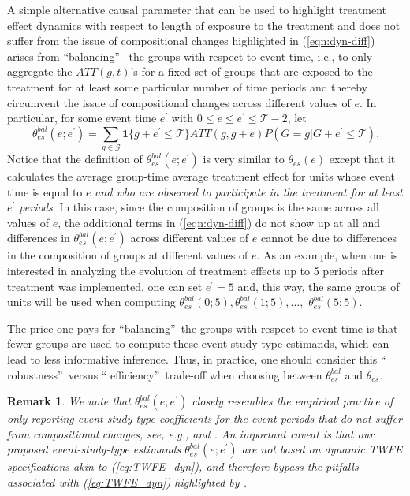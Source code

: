 \documentclass[11pt]{article}%
\theoremstyle{plain}
\newtheorem{remark}{Remark}
\numberwithin{sassumption}{section}
\numberwithin{equation}{section}
\begin{document}
A simple alternative causal parameter that can be used to highlight treatment
effect dynamics with respect to length of exposure to the treatment and does
not suffer from the issue of compositional changes highlighted in
(\ref{eqn:dyn-diff}) arises from \textquotedblleft balancing\textquotedblright%
\ the groups with respect to event time, i.e., to only aggregate the
$ATT\left(  g,t\right)  $'s for a fixed set of groups that are exposed to the
treatment for at least some particular number of time periods and thereby circumvent
the issue of compositional changes across different values of $e$. In
particular, for some event time $e^{\prime}$ with $0\leq e\leq e^{\prime}%
\leq\mathcal{T}-2$, let%
\begin{equation}
\theta_{es}^{bal}(e;e^{\prime})=\sum_{g\in\mathcal{G}}\mathbf{1}\{g+e^{\prime
}\leq\mathcal{T}\}ATT(g,g+e)P(G=g|G+e^{\prime}\leq\mathcal{T}).
\label{eqn:agg-es-bal}%
\end{equation}
Notice that the definition of $\theta_{es}^{bal}(e;e^{\prime})$ is very
similar to $\theta_{es}(e)$ except that it calculates the average group-time
average treatment effect for units whose event time is equal to $e$
\textit{and who are observed to participate in the treatment for at least
$e^{\prime}$ periods}. In this case, since the composition of groups is the
same across all values of $e$, the additional terms in (\ref{eqn:dyn-diff}) do
not show up at all and differences in $\theta_{es}^{bal}(e;e^{\prime})$ across
different values of $e$ cannot be due to differences in the composition of
groups at different values of $e$. As an example, when one is interested in
analyzing the evolution of treatment effects up to 5 periods after treatment
was implemented, one can set $e^{\prime}=5$ and, this way, the same groups of
units will be used when computing $\theta_{es}^{bal}(0;5),\theta_{es}%
^{bal}(1;5),\dots,$ $\theta_{es}^{bal}(5;5)$.

The price one pays for \textquotedblleft balancing\textquotedblright\ the
groups with respect to event time is that fewer groups are used to compute
these event-study-type estimands, which can lead to less informative
inference. Thus, in practice, one should consider this \textquotedblleft
robustness\textquotedblright\ versus \textquotedblleft
efficiency\textquotedblright\ trade-off when choosing between $\theta
_{es}^{bal}$ and $\theta_{es}$.

\begin{remark}
We note that $\theta_{es}^{bal}(e;e^{\prime})$ closely resembles the empirical
practice of only reporting event-study-type coefficients for the event periods
that do not suffer from compositional changes, see, e.g., \cite{McCrary2007}
and \cite{Bailey2015}. An important caveat is that our proposed
event-study-type estimands $\theta_{es}^{bal}(e;e^{\prime})$ are not based on
dynamic TWFE specifications akin to (\ref{eq:TWFE_dyn}), and therefore bypass
the pitfalls associated with (\ref{eq:TWFE_dyn}) highlighted by
\cite{Abraham2018}.
\end{remark}
\end{document}
